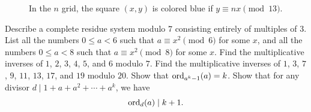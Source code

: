 \begin{figure}[p]
  \centering
  \def\m{4}
  \def\n{3}
  \def\cellsize{2.5mm}
  \def\horizontalgap{3.6}
  \def\verticalgap{4.5}
  
  \pgfmathtruncatemacro{\p}{\m*\n+1}
  

  \caption[Weaving patterns modulo $13$]{In the $n$\supth{} grid, the square $(x,y)$ is colored blue if $y\equiv nx\pmod{13}$.}
  \label{figure:weaving-patters-mod-13}
\end{figure}

\exercises

\begin{starter}
  \exercise Describe a complete residue system modulo $7$ consisting entirely of multiples of $3$.
  \exercise List all the numbers $0\leq a<6$ such that $a\equiv x^2\pmod 6$ for some $x$, and all the numbers $0\leq a<8$ such that $a\equiv x^2\pmod 8$ for some $x$.
  \exercise Find the multiplicative inverses of $1$, $2$, $3$, $4$, $5$, and $6$ modulo $7$.
  \exercise Find the multiplicative inverses of $1$, $3$, $7$, $9$, $11$, $13$, $17$, and $19$ modulo $20$.
  \exercise Show that $\operatorname{ord}_{a^k-1}(a)=k$.
  \exercise Show that for any divisor $d\mid 1+a+a^2+\cdots +a^k$, we have
  \begin{equation*}
    \operatorname{ord}_d(a)\mid k+1.
  \end{equation*}
\end{starter}

